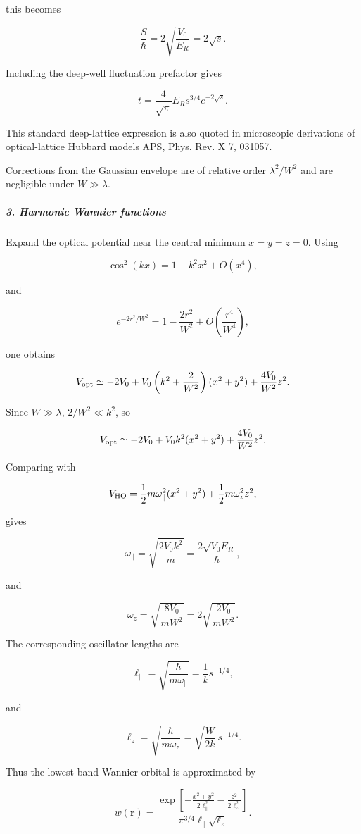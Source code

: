 this becomes

\[
\frac{S}{\hbar}=2\sqrt{\frac{V_0}{E_R}}=2\sqrt{s}.
\]

Including the deep-well fluctuation prefactor gives

\[
{ t= \frac{4}{\sqrt{\pi}}E_R s^{3/4}e^{-2\sqrt{s}} }.
\]

This standard deep-lattice expression is also quoted in microscopic derivations of optical-lattice Hubbard models \href{\detokenize{https://journals.aps.org/prx/pdf/10.1103/PhysRevX.7.031057}}{APS, Phys. Rev. X 7, 031057}.

Corrections from the Gaussian envelope are of relative order $\lambda^2/W^2$ and are negligible under $W\gg\lambda$.

\subparagraph*{3. Harmonic Wannier functions}

Expand the optical potential near the central minimum $x=y=z=0$. Using

\[
\cos^2(kx)=1-k^2x^2+O(x^4),
\]

and

\[
e^{-2r^2/W^2} = 1-\frac{2r^2}{W^2} +O\!\left(\frac{r^4}{W^4}\right),
\]

one obtains

\[
V_{\rm opt} \simeq -2V_0 + V_0\left(k^2+\frac{2}{W^2}\right)(x^2+y^2) + \frac{4V_0}{W^2}z^2.
\]

Since $W\gg\lambda$, $2/W^2\ll k^2$, so

\[
V_{\rm opt} \simeq -2V_0 + V_0k^2(x^2+y^2) + \frac{4V_0}{W^2}z^2.
\]

Comparing with

\[
V_{\rm HO} = \frac12m\omega_\parallel^2(x^2+y^2) + \frac12m\omega_z^2z^2,
\]

gives

\[
\omega_\parallel = \sqrt{\frac{2V_0k^2}{m}} = \frac{2\sqrt{V_0E_R}}{\hbar},
\]

and

\[
\omega_z = \sqrt{\frac{8V_0}{mW^2}} = 2\sqrt{\frac{2V_0}{mW^2}}.
\]

The corresponding oscillator lengths are

\[
\ell_\parallel = \sqrt{\frac{\hbar}{m\omega_\parallel}} = \frac{1}{k}s^{-1/4},
\]

and

\[
\ell_z = \sqrt{\frac{\hbar}{m\omega_z}} = \sqrt{\frac{W}{2k}}\,s^{-1/4}.
\]

Thus the lowest-band Wannier orbital is approximated by

\[
w(\mathbf r) = \frac{ \exp\!\left[ -\frac{x^2+y^2}{2\ell_\parallel^2} -\frac{z^2}{2\ell_z^2} \right] }{ \pi^{3/4}\ell_\parallel\sqrt{\ell_z} }.
\]

